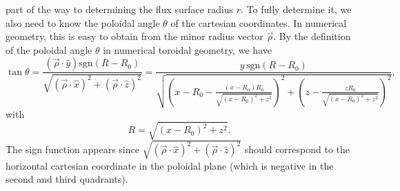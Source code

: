\documentclass{notes}
\begin{document}
    part of the way to determining the flux surface radius $r$. To fully
    determine it, we also need to know the poloidal angle $\theta$ of the
    cartesian coordinates. In numerical geometry, this is easy to obtain from
    the minor radius vector $\vec{\rho}$. By the definition of the poloidal
    angle $\theta$ in numerical toroidal geometry, we have
    \begin{equation}
        \tan\theta = \frac{\left(\vec{\rho}\cdot\hat{y}\right)\mathrm{sgn}\left(R-R_0\right)}
            {\sqrt{\left(\vec{\rho}\cdot\hat{x}\right)^2 + \left(\vec{\rho}\cdot\hat{z}\right)^2}}
        = \frac{y\,\mathrm{sgn}\left(R-R_0\right)}{\sqrt{
            \left(x-R_0-\frac{(x-R_0)R_0}{\sqrt{\left(x-R_0\right)^2 + z^2}}\right)^2
            + \left(z-\frac{zR_0}{\sqrt{\left(x-R_0\right)^2 + z^2}}\right)^2
        }},
    \end{equation}
    with
    \begin{equation}
        R = \sqrt{(x-R_0)^2+z^2}.
    \end{equation}
    The sign function appears since
    $\sqrt{(\vec{\rho}\cdot\hat{x})^2 + (\vec{\rho}\cdot\hat{z})^2}$
    should correspond to the horizontal cartesian coordinate in the poloidal
    plane (which is negative in the second and third quadrants).
\end{document}
